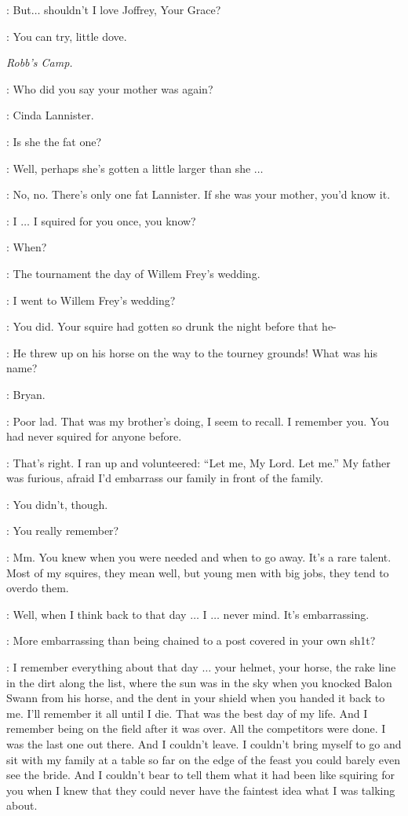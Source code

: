 \SANSA: But$\ldots$ shouldn't I love Joffrey, Your Grace?

\CERSEI: You can try, little dove.


\scene

\textit{Robb's Camp.}


\JAIME: Who did you say your mother was again?

\ALTON: Cinda Lannister.

\JAIME: Is she the fat one?

\ALTON: Well, perhaps she's gotten a little larger than she $\ldots$

\JAIME: No, no. There's only one fat Lannister. If she was your mother, you'd know it.

\ALTON: I $\ldots$ I squired for you once, you know?

\JAIME: When?

\ALTON: The tournament the day of Willem Frey's wedding.

\JAIME: I went to Willem Frey's wedding?

\ALTON: You did. Your squire had gotten so drunk the night before that he-

\JAIME: He threw up on his horse on the way to the tourney grounds! What was his name?

\ALTON: Bryan.

\JAIME: Poor lad. That was my brother's doing, I seem to recall. I remember you. You had never squired for anyone before.

\ALTON: That's right. I ran up and volunteered: ``Let me, My Lord. Let me.'' My father was furious, afraid I'd embarrass our family in front of the family.

\JAIME: You didn't, though.

\ALTON: You really remember?

\JAIME: Mm. You knew when you were needed and when to go away. It's a rare talent. Most of my squires, they mean well, but young men with big jobs, they tend to overdo them.

\ALTON: Well, when I think back to that day $\ldots$  I $\ldots$ never mind. It's embarrassing.

\JAIME: More embarrassing than being chained to a post covered in your own sh1t?

\ALTON: I remember everything about that day $\ldots$ your helmet, your horse, the rake line in the dirt along the list, where the sun was in the sky when you knocked Balon Swann from his horse, and the dent in your shield when you handed it back to me. I'll remember it all until I die. That was the best day of my life. And I remember being on the field after it was over. All the competitors were done. I was the last one out there. And I couldn't leave. I couldn't bring myself to go and sit with my family at a table so far on the edge of the feast you could barely even see the bride. And I couldn't bear to tell them what it had been like squiring for you when I knew that they could never have the faintest idea what I was talking about.

